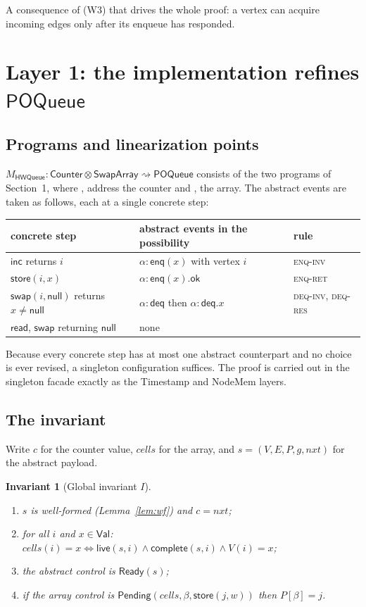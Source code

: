 \documentclass[11pt]{article}
\newtheorem{invariant}[lemma]{Invariant}
\theoremstyle{definition}
\theoremstyle{remark}
\newcommand{\Val}{\mathsf{Val}}
\newcommand{\Ready}{\mathsf{Ready}}
\newcommand{\Pend}{\mathsf{Pending}}
\newcommand{\Enq}{\mathsf{enq}}
\newcommand{\Deq}{\mathsf{deq}}
\newcommand{\Inc}{\mathsf{inc}}
\newcommand{\Read}{\mathsf{read}}
\newcommand{\Swap}{\mathsf{swap}}
\newcommand{\Store}{\mathsf{store}}
\newcommand{\ok}{\mathsf{ok}}
\newcommand{\nul}{\mathsf{null}}
\newcommand{\live}{\mathsf{live}}
\newcommand{\complete}{\mathsf{complete}}
\newcommand{\code}[1]{\texttt{\detokenize{#1}}}
\newcommand{\Counter}{\mathsf{Counter}}
\newcommand{\SwapArray}{\mathsf{SwapArray}}
\newcommand{\POQueue}{\mathsf{POQueue}}
\newcommand{\HWQ}{\mathsf{HWQueue}}
\newcommand{\refines}{\rightsquigarrow}
\begin{document}
A consequence of (W3) that drives the whole proof: a vertex can acquire
incoming edges only after its enqueue has responded.

\section{Layer 1: the implementation refines \texorpdfstring{$\POQueue$}{POQueue}}
\label{sec:layer1}

\subsection{Programs and linearization points}

$M_{\HWQ} : \Counter \otimes \SwapArray \refines \POQueue$ consists of the
two programs of Section~1, where \code{inc}, \code{read} address the counter
and \code{store}, \code{swap} the array.  The abstract events are taken as
follows, each at a single concrete step:

\begin{center}
\begin{tabular}{@{}lll@{}}
\toprule
concrete step & abstract events in the possibility & rule \\
\midrule
$\Inc$ returns $i$ & $\alpha{:}\Enq(x)$ with vertex $i$ & \textsc{enq-inv} \\
$\Store(i, x)$ & $\alpha{:}\Enq(x).\ok$ & \textsc{enq-ret} \\
$\Swap(i, \nul)$ returns $x \ne \nul$ & $\alpha{:}\Deq$ then $\alpha{:}\Deq.x$ & \textsc{deq-inv}, \textsc{deq-res} \\
$\Read$, $\Swap$ returning $\nul$ & none & \\
\bottomrule
\end{tabular}
\end{center}

Because every concrete step has at most one abstract counterpart and no
choice is ever revised, a singleton configuration suffices.  The proof is
carried out in the singleton facade exactly as the Timestamp and NodeMem
layers.

\subsection{The invariant}

Write $c$ for the counter value, $\mathit{cells}$ for the array, and
$s = (V, E, P, g, \mathit{nxt})$ for the abstract payload.

\begin{invariant}[Global invariant $I$]\label{inv:global}
\begin{enumerate}[label=(I\arabic*),nosep]
\item $s$ is well-formed (Lemma~\ref{lem:wf}) and $c = \mathit{nxt}$;
\item for all $i$ and $x \in \Val$:
  $\mathit{cells}(i) = x \iff \live(s, i) \wedge \complete(s, i) \wedge V(i) = x$;
\item the abstract control is $\Ready(s)$;
\item if the array control is $\Pend(\mathit{cells}, \beta, \Store(j, w))$
  then $P[\beta] = j$.
\end{enumerate}
\end{invariant}
\end{document}
